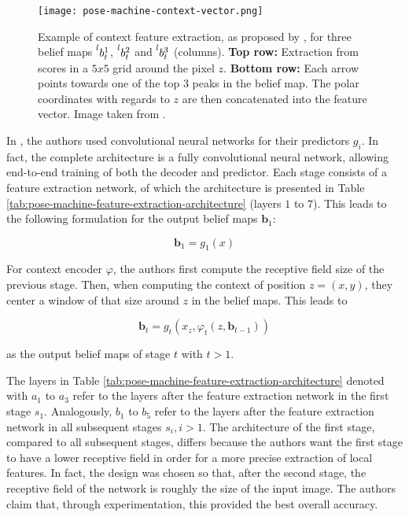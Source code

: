 \begin{figure}[htb!]
    \centering
    \texttt{[image: pose-machine-context-vector.png]}
    \caption{Example of context feature extraction, as proposed by \cite{ramakrishna_pose_2014}, for three belief maps $\prescript{l}{}{b_t^1}$, $\prescript{l}{}{b_t^2}$ and $\prescript{l}{}{b_t^3}$ (columns). \textbf{Top row:} Extraction from scores in a $5 x 5$ grid around the pixel $z$. \textbf{Bottom row:} Each arrow points towards one of the top $3$ peaks in the belief map. The polar coordinates with regards to $z$ are then concatenated into the feature vector. Image taken from \cite{ramakrishna_pose_2014}.}
    \label{fig:pose-machines-context}
\end{figure}


In \cite{wei_convolutional_2016}, the authors used convolutional neural networks for their predictors $g_i$.
In fact, the complete architecture is a fully convolutional neural network, allowing end-to-end training of both the decoder and predictor.
Each stage consists of a feature extraction network, of which the architecture is presented in Table \ref{tab:pose-machine-feature-extraction-architecture} (layers $1$ to $7$).
This leads to the following formulation for the output belief maps $\bm{b}_1$:

\begin{equation}
    \bm{b}_1 = g_1 (x)
\end{equation}

For context encoder $\varphi$, the authors first compute the receptive field size of the previous stage.
Then, when computing the context of position $z = (x, y)$, they center a  window of that size around $z$ in the belief maps.
This leads to 

\begin{equation}
    \bm{b}_t = g_t(x_z, \varphi_t(z, \bm{b}_{t-1}))
\end{equation}

as the output belief maps of stage $t$ with $t > 1$.

The layers in Table \ref{tab:pose-machine-feature-extraction-architecture} denoted with $a_1$ to $a_3$ refer to the layers after the feature extraction network in the first stage $s_1$.
Analogously, $b_1$ to $b_5$ refer to the layers after the feature extraction network in all subsequent stages $s_i, i > 1$.
The architecture of the first stage, compared to all subsequent stages, differs because the authors want the first stage to have a lower receptive field in order for a more precise extraction of local features.
In fact, the design was chosen so that, after the second stage, the receptive field of the network is roughly the size of the input image.
The authors claim that, through experimentation, this provided the best overall accuracy.

